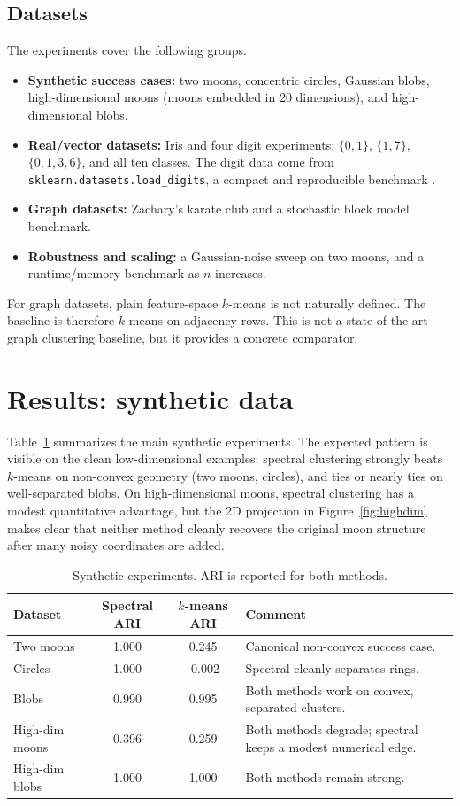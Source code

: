\documentclass[11pt]{article}
\theoremstyle{plain}
\theoremstyle{definition}
\begin{document}
\subsection{Datasets}
The experiments cover the following groups.
\begin{itemize}[leftmargin=1.4em]
    \item \textbf{Synthetic success cases:} two moons, concentric circles, Gaussian blobs, high-dimensional moons (moons embedded in 20 dimensions), and high-dimensional blobs.
    \item \textbf{Real/vector datasets:} Iris and four digit experiments: $\{0,1\}$, $\{1,7\}$, $\{0,1,3,6\}$, and all ten classes. The digit data come from \texttt{sklearn.datasets.load\_digits}, a compact and reproducible benchmark \cite{sklearnDigits}.
    \item \textbf{Graph datasets:} Zachary's karate club and a stochastic block model benchmark.
    \item \textbf{Robustness and scaling:} a Gaussian-noise sweep on two moons, and a runtime/memory benchmark as $n$ increases.
\end{itemize}

For graph datasets, plain feature-space $k$-means is not naturally defined. The baseline is therefore $k$-means on adjacency rows. This is not a state-of-the-art graph clustering baseline, but it provides a concrete comparator.

\section{Results: synthetic data}
Table~\ref{tab:synthetic} summarizes the main synthetic experiments. The expected pattern is visible on the clean low-dimensional examples: spectral clustering strongly beats $k$-means on non-convex geometry (two moons, circles), and ties or nearly ties on well-separated blobs. On high-dimensional moons, spectral clustering has a modest quantitative advantage, but the 2D projection in Figure~\ref{fig:highdim} makes clear that neither method cleanly recovers the original moon structure after many noisy coordinates are added.

\begin{table}[H]
\centering
\caption{Synthetic experiments. ARI is reported for both methods.}
\label{tab:synthetic}
\begin{tabular}{>{\raggedright\arraybackslash}p{3.2cm}ccp{5.1cm}}
\toprule
Dataset & Spectral ARI & $k$-means ARI & Comment \\
\midrule
Two moons & 1.000 & 0.245 & Canonical non-convex success case. \\
Circles & 1.000 & -0.002 & Spectral cleanly separates rings. \\
Blobs & 0.990 & 0.995 & Both methods work on convex, separated clusters. \\
High-dim moons & 0.396 & 0.259 & Both methods degrade; spectral keeps a modest numerical edge. \\
High-dim blobs & 1.000 & 1.000 & Both methods remain strong. \\
\bottomrule
\end{tabular}
\end{table}
\end{document}
